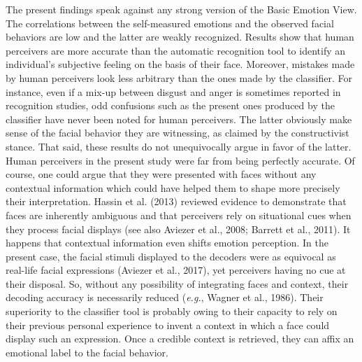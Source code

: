 \documentclass[
  english,
  man]{apa7}
\begin{document}
The present findings speak against any strong version of the Basic Emotion View. The correlations between the self-measured emotions and the observed facial behaviors are low and the latter are weakly recognized. Results show that human perceivers are more accurate than the automatic recognition tool to identify an individual's subjective feeling on the basis of their face. Moreover, mistakes made by human perceivers look less arbitrary than the ones made by the classifier. For instance, even if a mix-up between disgust and anger is sometimes reported in recognition studies, odd confusions such as the present ones produced by the classifier have never been noted for human perceivers. The latter obviously make sense of the facial behavior they are witnessing, as claimed by the constructivist stance. That said, these results do not unequivocally argue in favor of the latter. Human perceivers in the present study were far from being perfectly accurate. Of course, one could argue that they were presented with faces without any contextual information which could have helped them to shape more precisely their interpretation. Hassin et al. (2013) reviewed evidence to demonstrate that faces are inherently ambiguous and that perceivers rely on situational cues when they process facial displays (see also Aviezer et al., 2008; Barrett et al., 2011). It happens that contextual information even shifts emotion perception. In the present case, the facial stimuli displayed to the decoders were as equivocal as real-life facial expressions (Aviezer et al., 2017), yet perceivers having no cue at their disposal. So, without any possibility of integrating faces and context, their decoding accuracy is necessarily reduced (\emph{e.g.}, Wagner et al., 1986). Their superiority to the classifier tool is probably owing to their capacity to rely on their previous personal experience to invent a context in which a face could display such an expression. Once a credible context is retrieved, they can affix an emotional label to the facial behavior.
\end{document}
